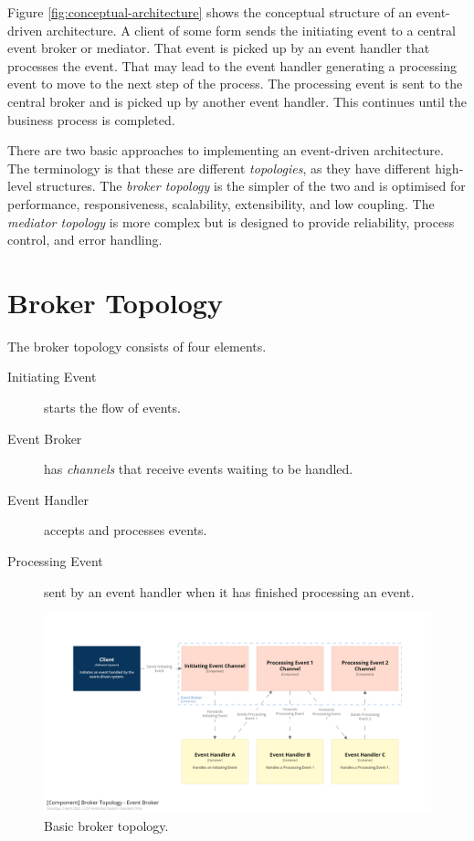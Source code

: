Figure \ref{fig:conceptual-architecture} shows the conceptual structure of an event-driven architecture.
A client of some form sends the initiating event to a central event broker or mediator.
That event is picked up by an event handler that processes the event.
That may lead to the event handler generating a processing event to move to the next step of the process.
The processing event is sent to the central broker and is picked up by another event handler.
This continues until the business process is completed.

There are two basic approaches to implementing an event-driven architecture.
The terminology is that these are different \emph{topologies}, as they have different high-level structures.
The \emph{broker topology} is the simpler of the two and is optimised for performance, responsiveness, scalability, extensibility, and low coupling.
The \emph{mediator topology} is more complex but is designed to provide reliability, process control, and error handling.


\section{Broker Topology}

The broker topology consists of four elements.

\begin{description}
    \item[Initiating Event] starts the flow of events.
    \item[Event Broker] has \emph{channels} that receive events waiting to be handled.
    \item[Event Handler] accepts and processes events.
    \item[Processing Event] sent by an event handler when it has finished processing an event.
\end{description}

\begin{figure}[h!]
    \begin{adjustwidth}{-10mm}{-10mm}
        \centering
        \includegraphics[trim=195 195 195 195,clip,width=0.97\paperwidth]{diagrams/broker-components.png}
    \end{adjustwidth}
    \caption{Basic broker topology.}
    \label{fig:broker-components}
\end{figure}

